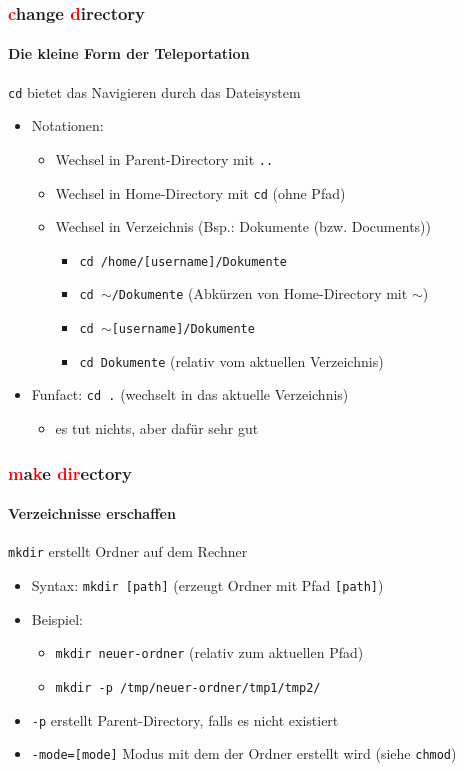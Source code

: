 \documentclass[12pt,utf8, handout]{beamer}
\begin{document}
\begin{frame}
\frametitle{\textcolor{red}{c}hange \textcolor{red}{d}irectory}
\framesubtitle{\textcolor{ownDarkOr}{Die kleine Form der Teleportation}}
\texttt{cd} bietet das Navigieren durch das Dateisystem
\begin{itemize}[<+->]
	\item Notationen:	
	\begin{itemize}[<+->]
		\item Wechsel in Parent-Directory mit \texttt{..}
		\item Wechsel in Home-Directory mit \texttt{cd}   (ohne Pfad)
		\item Wechsel in Verzeichnis (Bsp.: Dokumente (bzw. Documents))
		\begin{itemize}[<+->]
			\item \texttt{cd /home/[username]/Dokumente}
			\item \texttt{cd $\sim$/Dokumente}   (Abkürzen von Home-Directory mit $\sim$)
			\item \texttt{cd $\sim$[username]/Dokumente}
			\item \texttt{cd Dokumente}    (relativ vom aktuellen Verzeichnis)
		\end{itemize}
	\end{itemize}
	\item Funfact: \texttt{cd .}  (wechselt in das aktuelle Verzeichnis)
	\begin{itemize}
		\item es tut nichts, aber dafür sehr gut
	\end{itemize}
\end{itemize}
\end{frame}

\begin{frame}
\frametitle{\textcolor{red}{m}a\textcolor{red}{k}e \textcolor{red}{dir}ectory}
\framesubtitle{\textcolor{ownDarkOr}{Verzeichnisse erschaffen}}
\texttt{mkdir} erstellt Ordner auf dem Rechner
\begin{itemize}[<+->]
	\item Syntax: \texttt{mkdir [path]}   (erzeugt Ordner mit Pfad \texttt{[path]})
	\item Beispiel:
	\begin{itemize}[<+->]
		\item \texttt{mkdir neuer-ordner}    (relativ zum aktuellen Pfad)
		\item \texttt{mkdir -p /tmp/neuer-ordner/tmp1/tmp2/}
	\end{itemize}
	\item \texttt{-p}   erstellt Parent-Directory, falls es nicht existiert
	\item \texttt{-mode=[mode]}  Modus mit dem der Ordner erstellt wird (siehe \texttt{chmod})
\end{itemize}
\end{frame}
\end{document}
